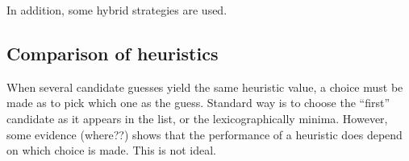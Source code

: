 In addition, some hybrid strategies are used.

\subsection{Comparison of heuristics}

When several candidate guesses yield the same heuristic value, a choice must be made as to pick which one as the guess. Standard way is to choose the ``first'' candidate as it appears in the list, or the lexicographically minima. However, some evidence (where??) shows that the performance of a heuristic does depend on which choice is made. This is not ideal.



























